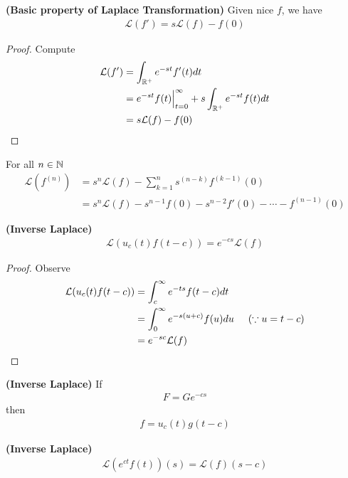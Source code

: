 \documentclass{report}
\begin{document}
\begin{theorem}
\textbf{(Basic property of Laplace Transformation)} Given nice $f$, we have
\begin{align*}
\mathcal{L}(f')=s\mathcal{L}(f)-f(0) 
\end{align*}
\end{theorem}
\begin{proof}
Compute 
\begin{align*}
\mathcal{L}(f')&=\int_{\mathbb{R}^+} e^{-st}f'(t)dt\\
&= e^{-st}f(t)\Big|_{t=0}^{\infty} + s\int_{\mathbb{R}^+} e^{-st}f(t)dt \\
&=s\mathcal{L}(f)-f(0)
\end{align*}
\end{proof}
\begin{corollary}
For all $n\in\mathbb{N}$
\begin{align*}
  \mathcal{L}(f^{(n)})&=s^n \mathcal{L}(f)- \sum_{k=1}^{n} s^{(n-k)} f^{(k-1)}(0)\\
  &=s^n \mathcal{L}(f)-s^{n-1}f(0)- s^{n-2}f'(0) - \cdots - f^{(n-1)}(0)
\end{align*}
\end{corollary}
\begin{theorem}
\textbf{(Inverse Laplace)} 
\begin{align*}
\mathcal{L}(u_c(t) f(t-c))= e^{-cs} \mathcal{L}(f)
\end{align*}
\end{theorem}
\begin{proof}
Observe
\begin{align*}
\mathcal{L}(u_c(t)f(t-c))&=\int_c^{\infty} e^{-ts}f(t-c)dt \\
&=\int_0^{\infty} e^{-s(u+c)}f(u)du\hspace{0.5cm} (\because u=t-c) \\
&=e^{-sc} \mathcal{L}(f)
\end{align*}
\end{proof}
\begin{corollary}
\textbf{(Inverse Laplace)} If 
\begin{align*}
F=Ge^{-cs}
\end{align*}
then
\begin{align*}
f=u_c(t)g(t-c)
\end{align*}
\end{corollary}
\begin{theorem}
\textbf{(Inverse Laplace)} 
\begin{align*}
\mathcal{L}(e^{ct}f(t))(s)= \mathcal{L}(f)(s-c)
\end{align*}
\end{theorem}
\end{document}
